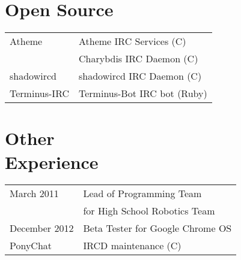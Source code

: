\documentclass[line, margin, 12pt]{res}
\begin{document}
\begin{resume}
\section{Open Source}
\begin{tabular}{l l}
Atheme & Atheme IRC Services (C) \\ [5pt]
& Charybdis IRC Daemon (C) \\ [5pt]
shadowircd & shadowircd IRC Daemon (C) \\ [5pt]
Terminus-IRC & Terminus-Bot IRC bot (Ruby) \\ [5pt]
\end{tabular}
     
\section{Other \\ Experience}
\begin{tabular}{l l}
March 2011 & Lead of Programming Team \\ [5pt]
 & for High School Robotics Team \\ [5pt]
December 2012 & Beta Tester for Google Chrome OS \\ [5pt]
PonyChat & IRCD maintenance (C) \\ [5pt]
\end{tabular}
     
\end{resume}
\end{document}
